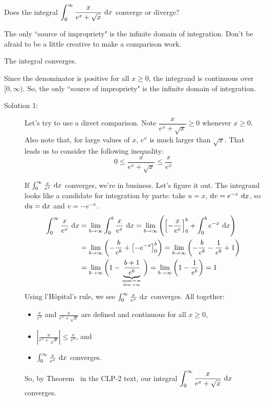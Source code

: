 \begin{Mquestion}
Does the integral $\displaystyle\int_0^\infty \frac{x}{e^x+\sqrt{x}} ~\mathrm{d}x$ converge or diverge?
\end{Mquestion}
\begin{hint}
The only ``source of impropriety" is the infinite domain of integration.
Don't be afraid to be a little creative to make a comparison work.
\end{hint}
\begin{answer}
The integral converges.
\end{answer}
\begin{solution}
Since the denominator is positive for all $x \geq 0$, the integrand is continuous over $[0, \infty)$. So, the only ``source of impropriety" is the infinite domain of integration.

\begin{description}
\item[Solution 1:] Let's try to use a direct comparison. Note $\dfrac{x}{e^x + \sqrt{x}} \geq 0$ whenever $x \geq 0$. Also note that, for large values of $x$, $e^x$ is much larger than $\sqrt{x}$. That leads us to consider the following inequality:
\[
0\leq \dfrac{x}{e^x + \sqrt{x}}  \leq \dfrac{x}{e^x }\]

If $\int_0^\infty \frac{x}{e^x}~\mathrm{d}x$ converges, we're in business. Let's figure it out. The integrand looks like a candidate for integration by parts: take $u=x$, $\mathrm{d}v = e^{-x}~\mathrm{d}x$, so $\mathrm{d}u=\mathrm{d}x$ and $v=-e^{-x}$.
\begin{align*}
\int_0^\infty \frac{x}{e^x}~\dee{x}&=\lim_{b \to \infty}\int_0^b \frac{x}{e^x}~\dee{x}=
\lim_{b \to \infty}\left( \left[-\frac{x}{e^x}\right]_0^b + \int_0^b e^{-x}~\dee{x} \right)\\&=
\lim_{b \to \infty}\left(-\frac{b}{e^b} +\left[-e^{-x}\right]_0^b \right)=
\lim_{b \to \infty}\left(-\frac{b}{e^b} -\frac{1}{e^b}+1 \right)\\&=
\lim_{b \to \infty}\bigg(1-\underbrace{\frac{b+1}{e^b}}_{\atp{\mathrm{num}\to\infty}{\mathrm{den}\to\infty}}  \bigg)=\lim_{b \to \infty}\bigg(1-\frac{1}{e^b} \bigg)=1
\end{align*}
Using l'H\^{o}pital's rule, we see $\int_0^\infty \frac{x}{e^x}~\mathrm{d}x$ converges.  All together:
\begin{itemize}
\item $\frac{x}{e^x}$ and $\frac{x}{e^x+\sqrt{x}}$ are defined and continuous for all $x \geq 0$,
\item $\left|\frac{x}{e^x+\sqrt{x}}\right|\leq \frac{x}{e^x}$, and
\item $\int_0^\infty \frac{x}{e^x}~\mathrm{d}x$ converges.
\end{itemize}
So, by Theorem~ in the CLP-2 text, our integral $\displaystyle\int_0^\infty \frac{x}{e^x+\sqrt{x}} ~\mathrm{d}x$ converges.


\end{description}
\end{solution}
